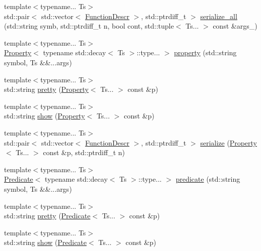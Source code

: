 \begin{DoxyCompactItemize}
\item 
{\footnotesize template$<$typename... Ts$>$ }\\std\+::pair$<$ std\+::vector$<$ \hyperlink{structpfq_1_1lang_1_1FunctionDescr}{Function\+Descr} $>$, std\+::ptrdiff\+\_\+t $>$ \hyperlink{namespacepfq_1_1lang_acd7f9c34960d4f3511228a5568628acf}{serialize\+\_\+all} (std\+::string symb, std\+::ptrdiff\+\_\+t n, bool cont, std\+::tuple$<$ Ts... $>$ const \&args\+\_\+)
\item 
{\footnotesize template$<$typename... Ts$>$ }\\\hyperlink{structpfq_1_1lang_1_1Property}{Property}$<$ typename std\+::decay$<$ Ts $>$\+::type... $>$ \hyperlink{namespacepfq_1_1lang_a1249450e72229273b0db707a286aea91}{property} (std\+::string symbol, Ts \&\&...args)
\item 
{\footnotesize template$<$typename... Ts$>$ }\\std\+::string \hyperlink{namespacepfq_1_1lang_ad72cdee2fca49246a75620232dfe061a}{pretty} (\hyperlink{structpfq_1_1lang_1_1Property}{Property}$<$ Ts... $>$ const \&p)
\item 
{\footnotesize template$<$typename... Ts$>$ }\\std\+::string \hyperlink{namespacepfq_1_1lang_a94bf1496c888adfd3d99e25895ed6df8}{show} (\hyperlink{structpfq_1_1lang_1_1Property}{Property}$<$ Ts... $>$ const \&p)
\item 
{\footnotesize template$<$typename... Ts$>$ }\\std\+::pair$<$ std\+::vector$<$ \hyperlink{structpfq_1_1lang_1_1FunctionDescr}{Function\+Descr} $>$, std\+::ptrdiff\+\_\+t $>$ \hyperlink{namespacepfq_1_1lang_ac9dfedf649f03709f23fc7ca4afc1679}{serialize} (\hyperlink{structpfq_1_1lang_1_1Property}{Property}$<$ Ts... $>$ const \&p, std\+::ptrdiff\+\_\+t n)
\item 
{\footnotesize template$<$typename... Ts$>$ }\\\hyperlink{structpfq_1_1lang_1_1Predicate}{Predicate}$<$ typename std\+::decay$<$ Ts $>$\+::type... $>$ \hyperlink{namespacepfq_1_1lang_aca9adafc436b7f851621b979fa1aaf88}{predicate} (std\+::string symbol, Ts \&\&...args)
\item 
{\footnotesize template$<$typename... Ts$>$ }\\std\+::string \hyperlink{namespacepfq_1_1lang_a365497365bebd1ef44492e8027a6b3c0}{pretty} (\hyperlink{structpfq_1_1lang_1_1Predicate}{Predicate}$<$ Ts... $>$ const \&p)
\item 
{\footnotesize template$<$typename... Ts$>$ }\\std\+::string \hyperlink{namespacepfq_1_1lang_a42c749f45910e4c14d412cc3db5791e5}{show} (\hyperlink{structpfq_1_1lang_1_1Predicate}{Predicate}$<$ Ts... $>$ const \&p)

\end{DoxyCompactItemize}
